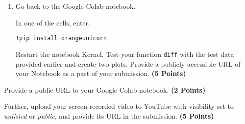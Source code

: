 \documentclass[12pt, xcolor=dvipsnames,svgnames,x11names]{article}
\begin{document}
\begin{enumerate}
\item Go back to the Google Colab notebook.

In one of the cells, enter.

\begin{verbatim}
!pip install orangeunicorn
\end{verbatim}

Restart the notebook Kernel. Test your function \texttt{diff} with the test data provided earlier and create two plots. Provide a publicly accessible URL of your Notebook as a part of your submission. \hfill \textbf{(5 Points)}

\end{enumerate}

Provide a public URL to your Google Colab notebook. \hfill \textbf{(2 Points)}

Further, upload your screen-recorded video to YouTube with visibility set to \textit{unlisted} or \textit{public}, and provide its URL in the submission.  \hfill \textbf{(5 Points)}
\end{document}
